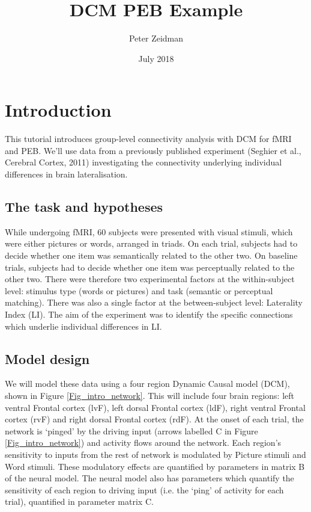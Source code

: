 \documentclass{article}
\title{DCM PEB Example}
\author{Peter Zeidman}
\date{July 2018}
\begin{document}
\maketitle

\tableofcontents

\section{Introduction}
This tutorial introduces group-level connectivity analysis with DCM for fMRI and PEB. We'll use data from a previously published experiment (Seghier et al., Cerebral Cortex, 2011) investigating the connectivity underlying individual differences in brain lateralisation. 

\subsection{The task and hypotheses}
While undergoing fMRI, 60 subjects were presented with visual stimuli, which were either pictures or words, arranged in triads. On each trial, subjects had to decide whether one item was semantically related to the other two. On baseline trials, subjects had to decide whether one item was perceptually related to the other two. There were therefore two experimental factors at the within-subject level: stimulus type (words or pictures) and task (semantic or perceptual matching). There was also a single factor at the between-subject level: Laterality Index (LI). The aim of the experiment was to identify the specific connections which underlie individual differences in LI.

\subsection{Model design}
We will model these data using a four region Dynamic Causal model (DCM), shown in Figure \ref{Fig_intro_network}. This will include four brain regions: left ventral Frontal cortex (lvF), left dorsal Frontal cortex (ldF), right ventral Frontal cortex (rvF) and right dorsal Frontal cortex (rdF). At the onset of each trial, the network is `pinged' by the driving input (arrows labelled C in Figure  \ref{Fig_intro_network}) and activity flows around the network. Each region's sensitivity to inputs from the rest of network is modulated by Picture stimuli and Word stimuli. These modulatory effects are quantified by parameters in matrix B of the neural model. The neural model also has parameters which quantify the sensitivity of each region to driving input  (i.e. the `ping' of activity for each trial), quantified in parameter matrix C. 
\end{document}
